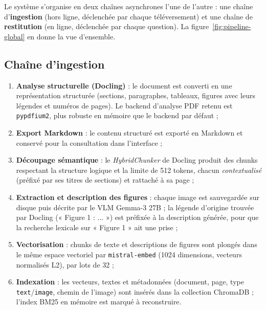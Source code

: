 Le système s'organise en deux chaînes asynchrones l'une de l'autre : une chaîne
d'\textbf{ingestion} (hors ligne, déclenchée par chaque téléversement) et une chaîne de
\textbf{restitution} (en ligne, déclenchée par chaque question). La
figure~\ref{fig:pipeline-global} en donne la vue d'ensemble.


\subsection{Chaîne d'ingestion}
\begin{enumerate}
  \item \textbf{Analyse structurelle (Docling)} : le document est converti en une
        représentation structurée (sections, paragraphes, tableaux, figures avec leurs
        légendes et numéros de pages). Le backend d'analyse PDF retenu est
        \texttt{pypdfium2}, plus robuste en mémoire que le backend par défaut ;
  \item \textbf{Export Markdown} : le contenu structuré est exporté en Markdown et conservé
        pour la consultation dans l'interface ;
  \item \textbf{Découpage sémantique} : le \emph{HybridChunker} de Docling produit des
        chunks respectant la structure logique et la limite de 512 tokens, chacun
        \emph{contextualisé} (préfixé par ses titres de sections) et rattaché à sa page ;
  \item \textbf{Extraction et description des figures} : chaque image est sauvegardée sur
        disque puis décrite par le VLM Gemma-3 27B ; la légende d'origine trouvée par
        Docling (« Figure 1 : ... ») est préfixée à la description générée, pour que la
        recherche lexicale sur « Figure 1 » ait une prise ;
  \item \textbf{Vectorisation} : chunks de texte et descriptions de figures sont plongés
        dans le même espace vectoriel par \texttt{mistral-embed} (1024 dimensions,
        vecteurs normalisés L2), par lots de 32 ;
  \item \textbf{Indexation} : les vecteurs, textes et métadonnées (document, page, type
        \texttt{text}/\texttt{image}, chemin de l'image) sont insérés dans la collection
        ChromaDB ; l'index BM25 en mémoire est marqué à reconstruire.
\end{enumerate}

